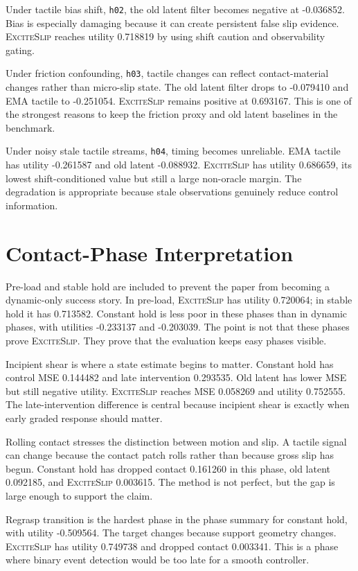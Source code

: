 \documentclass{article}
\newcommand{\method}{\textsc{ExciteSlip}\xspace}
\begin{document}
Under tactile bias shift, \texttt{h02}, the old latent filter becomes negative at -0.036852. Bias is especially damaging because it can create persistent false slip evidence. \method reaches utility 0.718819 by using shift caution and observability gating.

Under friction confounding, \texttt{h03}, tactile changes can reflect contact-material changes rather than micro-slip state. The old latent filter drops to -0.079410 and EMA tactile to -0.251054. \method remains positive at 0.693167. This is one of the strongest reasons to keep the friction proxy and old latent baselines in the benchmark.

Under noisy stale tactile streams, \texttt{h04}, timing becomes unreliable. EMA tactile has utility -0.261587 and old latent -0.088932. \method has utility 0.686659, its lowest shift-conditioned value but still a large non-oracle margin. The degradation is appropriate because stale observations genuinely reduce control information.

\section{Contact-Phase Interpretation}

Pre-load and stable hold are included to prevent the paper from becoming a dynamic-only success story. In pre-load, \method has utility 0.720064; in stable hold it has 0.713582. Constant hold is less poor in these phases than in dynamic phases, with utilities -0.233137 and -0.203039. The point is not that these phases prove \method. They prove that the evaluation keeps easy phases visible.

Incipient shear is where a state estimate begins to matter. Constant hold has control MSE 0.144482 and late intervention 0.293535. Old latent has lower MSE but still negative utility. \method reaches MSE 0.058269 and utility 0.752555. The late-intervention difference is central because incipient shear is exactly when early graded response should matter.

Rolling contact stresses the distinction between motion and slip. A tactile signal can change because the contact patch rolls rather than because gross slip has begun. Constant hold has dropped contact 0.161260 in this phase, old latent 0.092185, and \method 0.003615. The method is not perfect, but the gap is large enough to support the claim.

Regrasp transition is the hardest phase in the phase summary for constant hold, with utility -0.509564. The target changes because support geometry changes. \method has utility 0.749738 and dropped contact 0.003341. This is a phase where binary event detection would be too late for a smooth controller.
\end{document}
